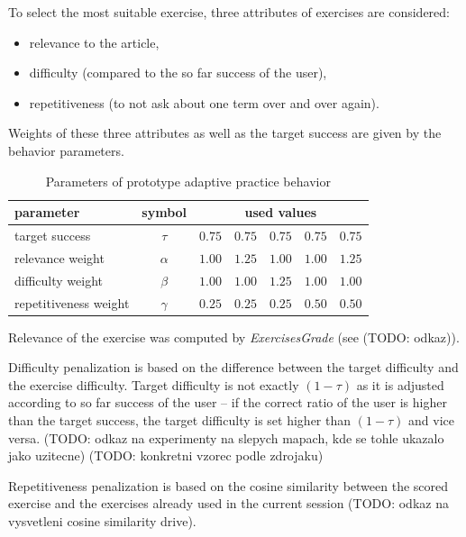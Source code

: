 \documentclass[a4paper, 12pt, twoside]{fithesis2}		%
\renewcommand{\_}{\leavevmode \kern0.0em\vbox{\hrule width0.4em}}
\newcommand{\squarebullet}{\textcolor{black}{\raisebox{0.15em}{\rule{4pt}{4pt}}}}
\newenvironment{myItemize}{
  \begin{itemize}[leftmargin=2em,rightmargin=1em,itemsep=\parskip ,parsep=0em,topsep=0em,partopsep=0em]
  \renewcommand{\labelitemi}{\squarebullet}
  \renewcommand{\labelitemii}{$\diamond$}
}{
  \end{itemize}
}
\begin{document}
To select the most suitable exercise, three attributes of exercises are considered:

\begin{myItemize}
  \item relevance to the article,
  \item difficulty (compared to the so far success of the user),
  \item repetitiveness (to not ask about one term over and over again).
\end{myItemize}

Weights of these three attributes as well as the target success
are given by the behavior parameters.

\begin{table}[h]
\begin{center}
\begin{tabular}{| l | c | r | r |  r  |  r |  r |}
  \hline
  parameter & symbol & \multicolumn{5}{|c|}{used values} \\
  \hline \hline
  target success & $\tau$           & $0.75$ & $0.75$ & $0.75$ & $0.75$ & $0.75$\\ \hline
  relevance weight & $\alpha$      & $1.00$ & $1.25$ & $1.00$ & $1.00$ & $1.25$\\ \hline
  difficulty weight & $\beta$      & $1.00$ & $1.00$ & $1.25$ & $1.00$ & $1.00$\\ \hline
  repetitiveness weight & $\gamma$ & $0.25$ & $0.25$ & $0.25$ & $0.50$ & $0.50$\\ \hline
\end{tabular}
\end{center}
\caption{Parameters of prototype adaptive practice behavior}
\end{table}

Relevance of the exercise was computed by \textit{ExercisesGrade} (see (TODO: odkaz)).

Difficulty penalization is based on the difference between the target difficulty and the exercise difficulty.
Target difficulty is not exactly $(1 - \tau)$ as it is adjusted according to
so far success of the user -- if the correct ratio of the user is higher than the target success,
the target difficulty is set higher than $(1 - \tau)$ and vice versa.
(TODO: odkaz na experimenty na slepych mapach, kde se tohle ukazalo jako uzitecne)
(TODO: konkretni vzorec podle zdrojaku)

Repetitiveness penalization is based on the cosine similarity between the scored exercise and the exercises already used in the current session (TODO: odkaz na vysvetleni cosine similarity drive).
\end{document}

